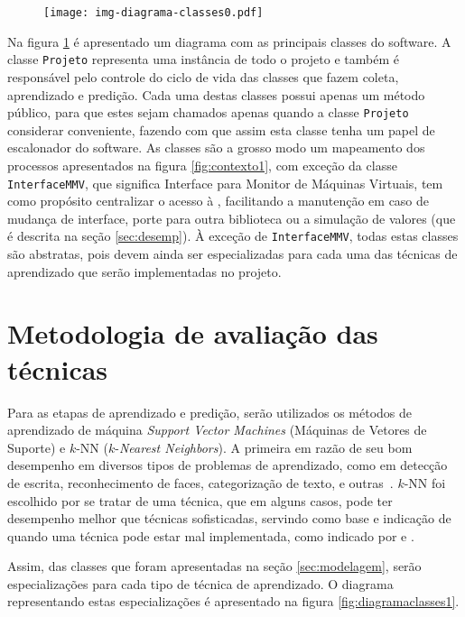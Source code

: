 \begin{figure}[htp]
\centering
\texttt{[image: img-diagrama-classes0.pdf]}
\label{fig:diagramaclasses0}
\end{figure}

Na figura \ref{fig:diagramaclasses0} é apresentado um diagrama com as
principais classes do software. A classe \texttt{Projeto} representa uma
instância de todo o projeto e também é responsável pelo controle do ciclo
de vida das classes que fazem coleta, aprendizado e predição. Cada uma
destas classes possui apenas um método público, para que estes sejam
chamados apenas quando a classe \texttt{Projeto} considerar conveniente,
fazendo com que assim esta classe tenha um papel de escalonador do
software. As classes são a grosso modo um mapeamento dos processos
apresentados na figura \ref{fig:contexto1}, com exceção da classe
\texttt{InterfaceMMV}, que significa Interface para Monitor de
Máquinas Virtuais, tem como propósito centralizar o acesso à \libvirt{},
facilitando a manutenção em caso de mudança de interface, porte para outra
biblioteca ou a simulação de valores (que é descrita na seção
\ref{sec:desemp}). À exceção de \texttt{InterfaceMMV}, todas estas
classes são abstratas, pois devem ainda ser especializadas para cada uma
das técnicas de aprendizado que serão implementadas no projeto.


\section{Metodologia de avaliação das técnicas}

Para as etapas de aprendizado e predição, serão utilizados os métodos de
aprendizado de máquina \emph{Support Vector Machines} (Máquinas de Vetores
de Suporte) e $k$-NN ($k$-\emph{Nearest Neighbors}). A primeira em razão de seu
bom desempenho em diversos tipos de problemas de aprendizado, como em
detecção de escrita, reconhecimento de faces, categorização de texto, e
outras~\cite{bennett2000support}. $k$-NN foi escolhido por se tratar de uma
técnica, que em alguns casos, pode ter desempenho melhor que técnicas
sofisticadas, servindo como base e indicação de quando uma técnica pode
estar mal implementada, como indicado por  e
.

Assim, das classes que foram apresentadas na seção \ref{sec:modelagem},
serão especializações para cada tipo de técnica de aprendizado. O diagrama
representando estas especializações é apresentado na figura
\ref{fig:diagramaclasses1}.

